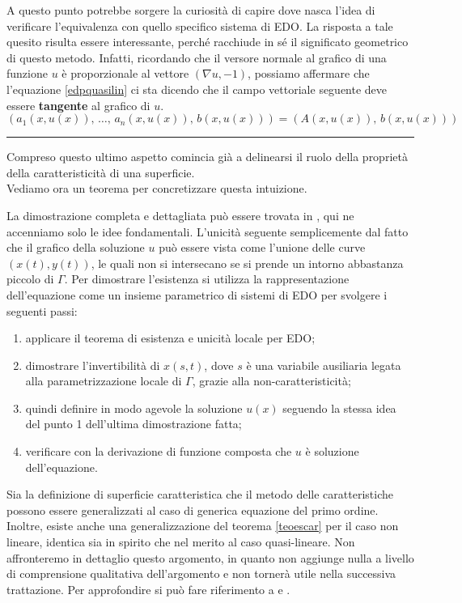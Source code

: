A questo punto potrebbe sorgere la curiosità di capire dove nasca l'idea di verificare l'equivalenza con quello specifico sistema di EDO. La risposta a tale quesito risulta essere interessante, perché racchiude in sé il significato geometrico di questo metodo. Infatti, ricordando che il versore normale al grafico di una funzione $u$ è proporzionale al vettore $(\nabla u , -1)$, possiamo affermare che l'equazione \eqref{edpquasilin} ci sta dicendo che il campo vettoriale seguente deve essere  \textbf{tangente} al grafico di $u$.
$$(a_1(x,u(x)),\, \ldots ,\, a_n(x,u(x)),\, b(x,u(x)))=(A(x,u(x)),\, b(x,u(x)))$$

\noindent\rule[0.5ex]{\linewidth}{0.2pt}

Compreso questo ultimo aspetto comincia già a delinearsi il ruolo della proprietà della caratteristicità di una superficie. \\
Vediamo ora un teorema per concretizzare questa intuizione.
\begin{theorem}\label{teoescar}
\end{theorem}
La dimostrazione completa e dettagliata può essere trovata in \cite[cap.1]{Folland}, qui ne accenniamo solo le idee fondamentali. L'unicità seguente semplicemente dal fatto che il grafico della soluzione $u$ può essere vista come l'unione delle curve $(x(t),y(t))$, le quali non si intersecano se si prende un intorno abbastanza piccolo di $\Gamma$. Per dimostrare l'esistenza si utilizza la rappresentazione dell'equazione come un insieme parametrico di sistemi di EDO per svolgere i seguenti passi:
\begin{enumerate}
\item applicare il teorema di esistenza e unicità locale per EDO;
\item dimostrare l'invertibilità di $x(s,t)$, dove $s$ è una variabile ausiliaria legata alla parametrizzazione locale di $\Gamma$, grazie alla non-caratteristicità;
\item quindi definire in modo agevole la soluzione $u(x)$ seguendo la stessa idea del punto 1 dell'ultima dimostrazione fatta;
\item verificare con la derivazione di funzione composta che $u$ è soluzione dell'equazione.
\end{enumerate}
Sia la definizione di superficie caratteristica che il metodo delle caratteristiche possono essere generalizzati al caso di generica equazione del primo ordine. Inoltre, esiste anche una generalizzazione del teorema \ref{teoescar} per il caso non lineare, identica sia in spirito che nel merito al caso quasi-lineare.
Non affronteremo in dettaglio questo argomento, in quanto non aggiunge nulla a livello di comprensione qualitativa dell'argomento e non tornerà utile nella successiva trattazione. Per approfondire si può fare riferimento a \cite[cap.1]{Folland} e \cite[cap.3]{Evans}.

